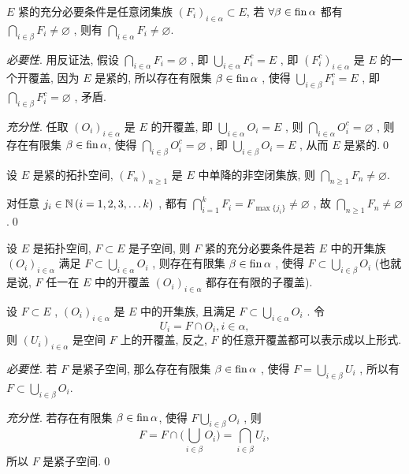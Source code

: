      \begin{Proposition}\label{prop:紧性的另一刻画}
           $ E $ 紧的充分必要条件是任意闭集族 $ (F_{i})_{i\in\alpha}\subset E $, 若 $ \forall \beta\in\operatorname{fin}\alpha $ 都有 $ \bigcap_{i\in\beta}F_{i}\neq \varnothing $ , 则有 $ \bigcap_{i\in\alpha}F_{i}\neq\varnothing $. 
     \end{Proposition}

     \begin{Proof}
          \textsl{必要性}. 用反证法, 假设 $ \bigcap_{i\in\alpha}F_{i}=\varnothing $ , 即 $ \bigcup_{i\in\alpha}F_{i}^{c}=E $ , 即 $ (F_{i}^{c})_{i\in\alpha} $ 是 $ E $ 的一个开覆盖, 因为 $ E $ 是紧的,  所以存在有限集 $ \beta\in\operatorname{fin}\alpha $ ,  使得 $ \bigcup_{i\in\beta}F_{i}^{c}=E $ , 即 $ \bigcap_{i\in\beta}F_{i}^{c}=\varnothing $ , 矛盾.

          \textsl{充分性}. 任取 $ (O_{i})_{i\in\alpha} $ 是 $ E $ 的开覆盖, 即 $ \bigcup_{i\in\alpha}O_{i}=E $ , 则 $ \bigcap_{i\in\alpha}O_{i}^{c}=\varnothing $ , 则存在有限集 $ \beta\in\operatorname{fin} \alpha $, 使得 $ \bigcap_{i\in\beta}O_{i}^{c}=\varnothing $ , 即 $ \bigcup_{i\in\beta}O_{i}=E $ , 从而 $ E $ 是紧的.\qed
     \end{Proof}

     \begin{Proposition}
          设 $ E $ 是紧的拓扑空间, $ (F_{n})_{n\geqslant1} $ 是 $ E $ 中单降的非空闭集族, 则 $ \bigcap_{n\geqslant1}F_{n}\neq\varnothing $. 
     \end{Proposition}

     \begin{Proof}
          对任意 $ j_{i}\in\mathbb{N}\,(i=1, 2, 3,\dots k) $ , 都有 $ \bigcap_{i=1}^{k}F_{i}=F_{\max\{ j_{i} \}}\neq\varnothing $ , 故 $ \bigcap_{n\geqslant1}F_{n}\neq\varnothing $ .\qed
     \end{Proof}

     \begin{Theorem}
           设 $ E $ 是拓扑空间,  $ F\subset E $ 是子空间, 则 $ F $ 紧的充分必要条件是若 $ E $ 中的开集族 $ (O_{i})_{i\in\alpha} $ 满足 $ F\subset \bigcup_{i\in\alpha}O_{i} $ , 则存在有限集 $ \beta\in\operatorname{fin}\alpha $ , 使得 $ F\subset\bigcup_{i\in\beta}O_{i} $ (也就是说, $ F $ 任一在 $ E $ 中的开覆盖 $ (O_{i})_{i\in\alpha} $ 都存在有限的子覆盖).
     \end{Theorem}
     
     \begin{Proof}
          设 $ F\subset E $ , $ (O_{i})_{i\in\alpha} $ 是 $ E $ 中的开集族, 且满足 $ F\subset \bigcup_{i\in\alpha}O_{i} $ . 令
          \[
               U_{i}=F\cap O_{i}, i\in\alpha,
          \]
          则 $ (U_{i})_{i\in\alpha} $ 是空间 $ F $ 上的开覆盖, 反之,  $ F $ 的任意开覆盖都可以表示成以上形式.

          \textsl{必要性}. 若 $ F $ 是紧子空间, 那么存在有限集 $ \beta\in\operatorname{fin}\alpha $ , 使得 $ F=\bigcup_{i\in\beta}U_{i} $ , 所以有 $ F\subset\bigcup_{i\in\beta}O_{i} $.

          \textsl{充分性}. 若存在有限集 $ \beta\in\operatorname{fin}\alpha $, 使得 $ F\bigcup_{i\in\beta}O_{i} $ , 则
          \[
               F=F\cap\bigg( \bigcup_{i\in\beta}O_{i} \bigg)=\bigcap_{i\in\beta}U_{i},
          \]
          所以 $ F $ 是紧子空间.\qed
     \end{Proof}

